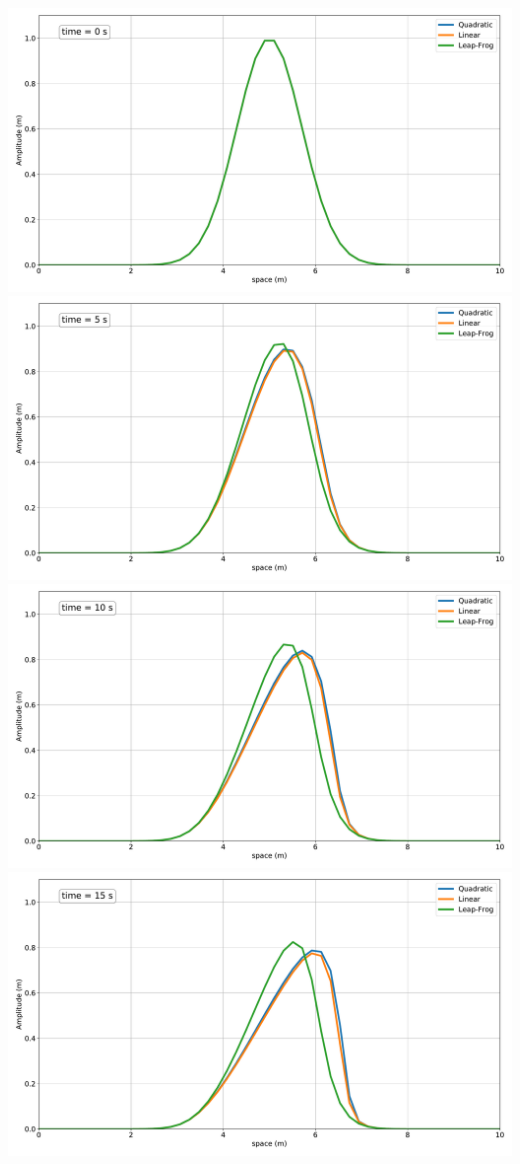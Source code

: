 \includegraphics[width=\linewidth]{../BurgersEquation/images/imp0.pdf}
\includegraphics[width=\linewidth]{../BurgersEquation/images/imp1.pdf}
\includegraphics[width=\linewidth]{../BurgersEquation/images/imp2.pdf}
\includegraphics[width=\linewidth]{../BurgersEquation/images/imp3.pdf}
